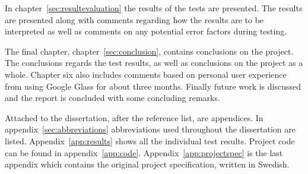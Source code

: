 In chapter~\ref{sec:resultevaluation} the results of the tests are presented. The results are presented along with comments regarding how the results are to be interpreted as well as comments on any potential error factors during testing.

The final chapter, chapter~\ref{sec:conclusion}, contains conclusions on the project. The conclusions regards the test results, as well as conclusions on the project as a whole. Chapter six also includes comments based on personal user experience from using Google Glass for about three months. Finally future work is discussed and the report is concluded with some concluding remarks.

Attached to the dissertation, after the reference list, are appendices. In appendix~\ref{sec:abbreviations} abbreviations used throughout the dissertation are listed. Appendix~\ref{app:results} shows all the individual test results. Project code can be found in appendix~\ref{app:code}. Appendix~\ref{app:projectspec} is the last appendix which contains the original project specification, written in Swedish.